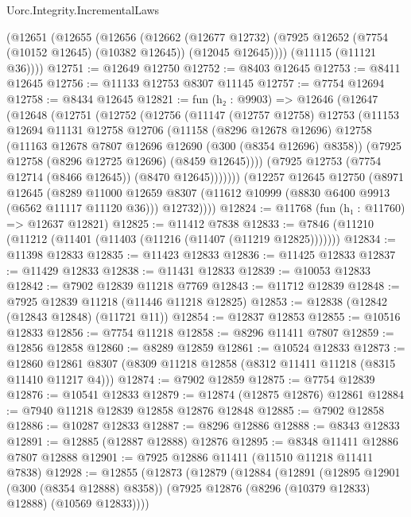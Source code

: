 \begin{lexlean}{Uorc.Integrity.IncrementalLaws}
\begin{coremodule}
    (@12651
      (@12655
        (@12656
          (@12662
            (@12677 @12732)
            (@7925 @12652 (@7754 (@10152 @12645) (@10382 @12645)) (@12045 @12645))))
        (@11115 (@11121 @36))))
@12751 := @12649 @12750
@12752 := @8403 @12645
@12753 := @8411 @12645
@12756 := @11133 @12753 @8307 @11145
@12757 := @7754 @12694
@12758 := @8434 @12645
@12821 := fun (h₂ : @9903) =>
  @12646
    (@12647
      (@12648
        (@12751
          (@12752
            (@12756
              (@11147
                (@12757 @12758)
                @12753
                (@11153
                  @12694
                  @11131
                  @12758
                  @12706
                  (@11158
                    (@8296 @12678 @12696)
                    @12758
                    (@11163 @12678 @7807 @12696 @12690 (@300 (@8354 @12696) @8358))
                    (@7925 @12758 (@8296 @12725 @12696) (@8459 @12645))))
                (@7925 @12753 (@7754 @12714 (@8466 @12645)) (@8470 @12645)))))))
      (@12257
        @12645
        @12750
        (@8971
          @12645
          (@8289
            @11000
            @12659
            @8307
            (@11612 @10999 (@8830 @6400 @9913 (@6562 @11117 @11120 @36)))
            @12732))))
@12824 := @11768 (fun (h₁ : @11760) => @12637 @12821)
@12825 := @11412 @7838
@12833 := @7846 (@11210 (@11212 (@11401 (@11403 (@11216 (@11407 (@11219 @12825)))))))
@12834 := @11398 @12833
@12835 := @11423 @12833
@12836 := @11425 @12833
@12837 := @11429 @12833
@12838 := @11431 @12833
@12839 := @10053 @12833
@12842 := @7902 @12839 @11218 @7769
@12843 := @11712 @12839
@12848 := @7925 @12839 @11218 (@11446 @11218 @12825)
@12853 := @12838 (@12842 (@12843 @12848) (@11721 @11))
@12854 := @12837 @12853
@12855 := @10516 @12833
@12856 := @7754 @11218
@12858 := @8296 @11411 @7807
@12859 := @12856 @12858
@12860 := @8289 @12859
@12861 := @10524 @12833
@12873 := @12860 @12861 @8307 (@8309 @11218 @12858 (@8312 @11411 @11218 (@8315 @11410 @11217 @4)))
@12874 := @7902 @12859
@12875 := @7754 @12839
@12876 := @10541 @12833
@12879 := @12874 (@12875 @12876) @12861
@12884 := @7940 @11218 @12839 @12858 @12876 @12848
@12885 := @7902 @12858
@12886 := @10287 @12833
@12887 := @8296 @12886
@12888 := @8343 @12833
@12891 := @12885 (@12887 @12888) @12876
@12895 := @8348 @11411 @12886 @7807 @12888
@12901 := @7925 @12886 @11411 (@11510 @11218 @11411 @7838)
@12928 := @12855
    (@12873
      (@12879
        (@12884
          (@12891
            (@12895 @12901 (@300 (@8354 @12888) @8358))
            (@7925 @12876 (@8296 (@10379 @12833) @12888) (@10569 @12833))))

\end{coremodule}
\end{lexlean}
